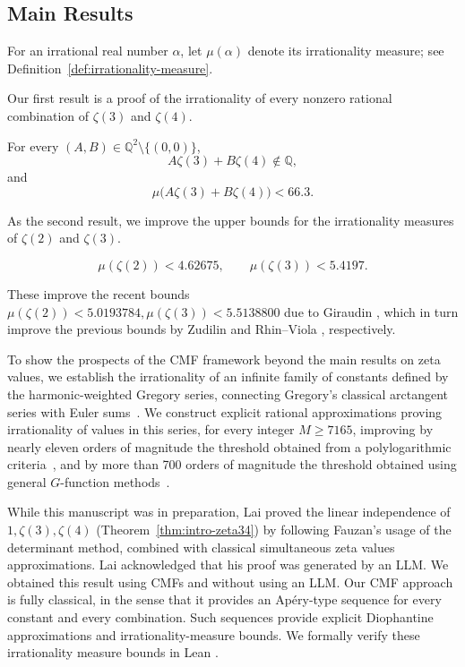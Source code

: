 \documentclass[oneside,english,11pt]{amsart}
\begin{document}
\subsection{Main Results}
For an irrational real number $\alpha$, let $\mu(\alpha)$ denote its
irrationality measure; see Definition~\ref{def:irrationality-measure}.

Our first result is a proof of the irrationality of every nonzero rational combination of $\zeta(3)$ and $\zeta(4)$.
\begin{mthm}
\label{thm:intro-zeta34}
For every $(A,B)\in\mathbb Q^2\setminus\{(0,0)\}$,
\[
    A\zeta(3)+B\zeta(4)\notin\mathbb Q,
\]
and
\[
    \mu\bigl(A\zeta(3)+B\zeta(4)\bigr)<66.3.
\]
\end{mthm}

As the second result, we improve the upper bounds for the irrationality measures of $\zeta(2)$ and $\zeta(3)$.
\begin{mthm}
\label{thm:intro-zeta23}
\[
    \mu(\zeta(2))<4.62675,
    \qquad
    \mu(\zeta(3))<5.4197.
\]
\end{mthm}
These improve the recent bounds %
$\mu(\zeta(2))<5.0193784, \mu(\zeta(3))<5.5138800$ due to Giraudin \cite{giraudin2026zeta2,giraudin2026zeta3}, which in turn improve the previous bounds by Zudilin \cite{zudilin2014zeta2} and Rhin--Viola \cite{rhinViola2001}, respectively.

To show the prospects of the CMF framework beyond the main results on zeta values, we establish the irrationality of an infinite family of constants defined by the harmonic-weighted Gregory series, 
connecting Gregory's classical arctangent series with Euler sums~\cite{euler1776meditationes,flajolet1998euler}. 
We construct explicit rational approximations proving irrationality of values in this series, for every integer $M\ge7165$, improving by nearly eleven orders of magnitude the threshold obtained from a polylogarithmic criteria~\cite{kawashima2026linear}, and by more than 700 orders of magnitude the threshold obtained using general $G$-function methods~\cite{fischler2018rational}.

While this manuscript was in preparation, Lai \cite{lai2026zeta34} proved the linear independence of $1,\zeta(3),\zeta(4)$ (Theorem~\ref{thm:intro-zeta34}) by following Fauzan's usage of the determinant method, combined with classical simultaneous zeta values approximations.
Lai acknowledged that his proof was generated by an LLM.
We obtained this result using CMFs and without using an LLM. 
Our CMF approach is fully classical, in the sense that it provides an Ap\'ery-type sequence for every constant and every combination. 
Such sequences provide explicit Diophantine approximations and irrationality-measure bounds.
We formally verify these irrationality measure bounds in Lean \cite{demoura2021lean4}.
\end{document}
